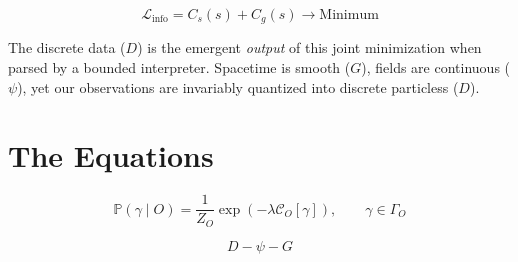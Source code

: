 \begin{equation}
\mathcal{L}_{\text{info}} = C_s(s) + C_g(s) \longrightarrow \text{Minimum}
\end{equation}

The discrete data ($D$) is the emergent \emph{output} of this joint minimization when parsed by a bounded interpreter.
Spacetime is smooth ($G$), fields are continuous ($\psi$), yet our observations are invariably quantized into discrete particless ($D$).




\section{The Equations}

\begin{tcolorbox}[title=\iameverything]

\[
\mathbb{P}(\gamma \mid O) = \frac{1}{Z_O} \exp\left(-\lambda\mathcal{C}_O[\gamma]\right), \qquad \gamma \in \Gamma_O
\]

  
\[
D-\psi-G
\]


\end{tcolorbox}
